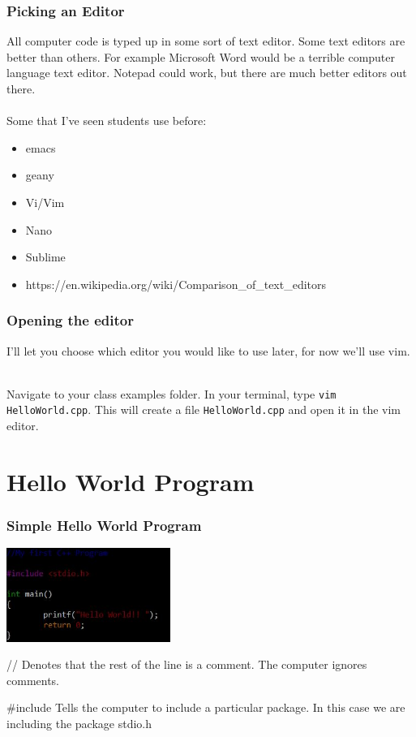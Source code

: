 \documentclass{if-beamer}
\begin{document}
\begin{frame}
\frametitle{Picking an Editor}
All computer code is typed up in some sort of text editor. Some text editors are better than others. For example Microsoft Word would be a terrible computer language text editor. Notepad could work, but there are much better editors out there. \\~\\
Some that I've seen students use before: 
\begin{itemize}
	\item emacs
	\item geany
	\item Vi/Vim
	\item Nano
	\item Sublime
	\item https://en.wikipedia.org/wiki/Comparison\_of\_text\_editors
\end{itemize}
\end{frame}

\begin{frame}
\frametitle{Opening the editor}
I'll let you choose which editor you would like to use later, for now we'll use vim. \\~\

Navigate to your class examples folder. In your terminal, type \texttt{vim HelloWorld.cpp}. This will create a file \texttt{HelloWorld.cpp} and open it in the vim editor. 

\end{frame}

\section{Hello World Program}

\begin{frame}
\frametitle{Simple Hello World Program}
\includegraphics[width = 0.4\textwidth]{figures/HelloWorld.jpg}
\begin{block}{//}
Denotes that the rest of the line is a comment. The computer ignores comments. 
\end{block}
\begin{block}{\#include}
Tells the computer to include a particular package. In this case we are including the package stdio.h
\end{block}
\end{frame}
\end{document}
